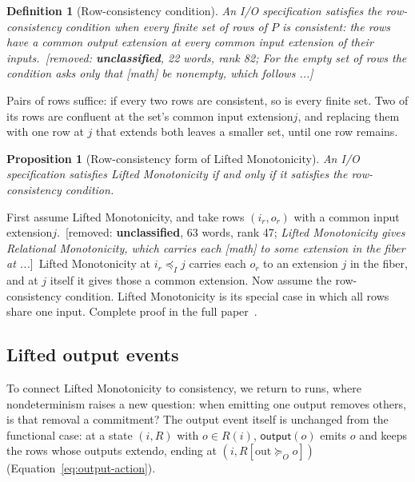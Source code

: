 \documentclass[sigconf]{cidr-2027}
\makeatletter
\newtheorem{proposition}{Proposition}
\newtheorem{definition}{Definition}
\theoremstyle{remark}
\newcommand{\InputOrd}{\preceq_I}
\newcommand{\OutputGe}{\succeq_O}
\newcommand{\commitment}{commitment\xspace}
\newcommand{\indesc}{input extension\xspace} %
\newcommand{\outrel}{extends\xspace}          %
\newcommand{\outrelbase}{extend\xspace}       %
\newcommand{\outnoun}{output extension\xspace}%
\newcommand{\spectype}[1][]{I/O specification#1\xspace}
\newcommand{\fullproof}{Complete proof in the full paper~\cite{hellerstein2026completecalmfull}.}
\renewenvironment{proof}[1][\proofname]{\par
  \pushQED{\qed}\normalfont\topsep2\p@\relax
  \trivlist\item[\@proofindent\hskip\labelsep{\@proofnamefont #1\@addpunct{.}}]\ignorespaces
}{\popQED\endtrivlist\@endpefalse}
\newcommand{\removednote}[1]{{\color{cutred}\footnotesize\,[removed: #1]\,}}
\makeatother
\begin{document}
\begin{definition}[Row-consistency condition]
\label{def:common-expansion-condition}
An \spectype satisfies the \emph{row-consistency condition} when every finite set of rows of $P$ is consistent: the rows have a common \outnoun at every common \indesc of their inputs. \removednote{\textbf{unclassified}, 22 words, rank 82; \textit{For the empty set of rows the condition asks only that [math] be nonempty, which follows ...}}
\end{definition}

Pairs of rows suffice: if every two rows are consistent, so is every finite
set. \textcolor{newblue}{Two of its rows are confluent at the set's common \indesc $j$, and
replacing them with one row at $j$ that \outrel both leaves a smaller set,
until one row remains.}

\begin{proposition}[Row-consistency form of Lifted Monotonicity]
\label{prop:common-expansion-form}
An \spectype satisfies Lifted Monotonicity if and only
if it satisfies the row-consistency condition.
\end{proposition}

\begin{proof}[Proof sketch]
\textcolor{newblue}{First assume Lifted Monotonicity, and take rows $(i_r,o_r)$ with a common
\indesc $j$.} \removednote{\textbf{unclassified}, 63 words, rank 47; \textit{Lifted Monotonicity gives Relational Monotonicity, which carries each [math] to some extension in the fiber at ...}} \textcolor{newblue}{Lifted Monotonicity at $i_r\InputOrd j$ carries
each $o_r$ to an extension $j$ in the fiber, and at $j$ itself it gives those
a common extension.} \textcolor{newblue}{Now assume the row-consistency condition.} \textcolor{newblue}{Lifted
Monotonicity is its special case in which all rows share one input.} \textcolor{newblue}{\fullproof}
\end{proof}

\subsection{Lifted output events}
\label{sec:lifted-output-events}

To connect Lifted Monotonicity to consistency, we return to
runs, where nondeterminism raises a new question: when emitting one output
removes others, is that removal a \commitment? \textcolor{newblue}{The output event itself is unchanged from the functional case: at a state $(i,R)$ with $o\in R(i)$,
$\mathsf{output}(o)$ emits $o$ and keeps the rows whose outputs \outrelbase $o$,
ending at $(i,R[\mathrm{out}\OutputGe o])$ (Equation~\ref{eq:output-action}).}
\end{document}
